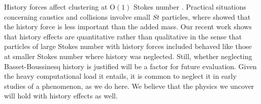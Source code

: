   History forces affect clustering at O$(1)$ Stokes number \cite{olivieri2014, daitche2015}. Practical situations concerning caustics and collisions involve small $St$ particles, where \citet{ferry2001} showed that the history force is less important than the added mass. Our recent work \cite{kapoor2024} shows that history effects are quantitative rather than qualitative in the sense that particles of large Stokes number with history forces included behaved like those at smaller Stokes number where history was neglected. Still, whether neglecting Basset-Boussinesq history is justified will be a factor for future evaluation. Given the heavy computational load it entails, it is common to neglect it in early studies of a phenomenon, as we do here. We believe that the physics we uncover will hold with history effects as well.  

